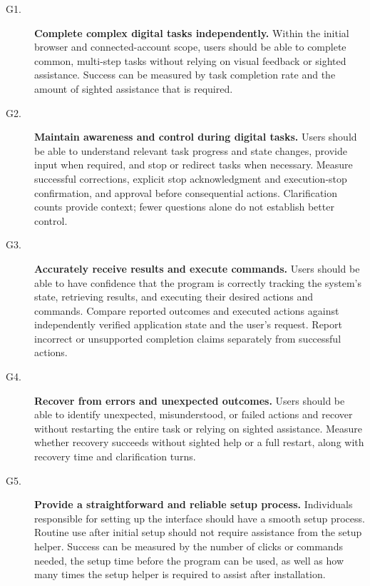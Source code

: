 \documentclass{scrreprt}
\theoremstyle{definition}
\newcommand{\reqtarget}[1]{\hypertarget{req:#1}{#1}}
\begin{document}
\begin{description}
    \item[\reqtarget{G1}.] \textbf{Complete complex digital tasks independently.}
    Within the initial browser and connected-account scope, users should be able to
    complete common, multi-step tasks without
    relying on visual feedback or sighted assistance. Success can be measured by task completion rate
    and the amount of sighted assistance that is required.

    \item[\reqtarget{G2}.] \textbf{Maintain awareness and control during digital tasks.}
    Users should be able to understand relevant task progress and state changes, provide input when required,
    and stop or redirect tasks when necessary. Measure successful corrections, explicit stop acknowledgment and execution-stop
    confirmation, and approval before consequential actions. Clarification counts
    provide context; fewer questions alone do not establish better control.

    \item[\reqtarget{G3}.] \textbf{Accurately receive results and execute commands.}
    Users should be able to have confidence that the program is correctly tracking the system's state,
    retrieving results, and executing their desired actions and commands. Compare reported outcomes and executed actions against independently verified
    application state and the user's request. Report incorrect or unsupported
    completion claims separately from successful actions.

    \item[\reqtarget{G4}.] \textbf{Recover from errors and unexpected outcomes.}
    Users should be able to identify unexpected, misunderstood, or failed actions and recover without restarting
    the entire task or relying on sighted assistance. Measure whether recovery succeeds without sighted help or a full restart,
    along with recovery time and clarification turns.

    \item[\reqtarget{G5}.] \textbf{Provide a straightforward and reliable setup process.}
    Individuals responsible for setting up the interface should have a smooth setup process.
    Routine use after initial setup should not require assistance from the setup helper. Success can be measured by the number of clicks or commands needed,
    the setup time before the program can be used, as well as how many times the setup helper is required to assist after installation.
\end{description}
\end{document}
